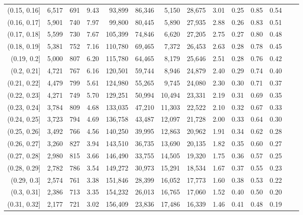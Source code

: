 \begin{tabular}{rrrrrrrrrrrrrr}
(0.15, 0.16]   &  6,517 &  691 &    9.43 &   93,899 &   86,346 &   5,150 &  28,675 &  3.01 &  0.25 &  0.85 &      0.54 \\
(0.16, 0.17]   &  5,901 &  740 &    7.97 &   99,800 &   80,445 &   5,890 &  27,935 &  2.88 &  0.26 &  0.83 &      0.51 \\
(0.17, 0.18]   &  5,599 &  730 &    7.67 &  105,399 &   74,846 &   6,620 &  27,205 &  2.75 &  0.27 &  0.80 &      0.48 \\
(0.18, 0.19]   &  5,381 &  752 &    7.16 &  110,780 &   69,465 &   7,372 &  26,453 &  2.63 &  0.28 &  0.78 &      0.45 \\
(0.19, 0.2]    &  5,000 &  807 &    6.20 &  115,780 &   64,465 &   8,179 &  25,646 &  2.51 &  0.28 &  0.76 &      0.42 \\
(0.2, 0.21]    &  4,721 &  767 &    6.16 &  120,501 &   59,744 &   8,946 &  24,879 &  2.40 &  0.29 &  0.74 &      0.40 \\
(0.21, 0.22]   &  4,479 &  799 &    5.61 &  124,980 &   55,265 &   9,745 &  24,080 &  2.30 &  0.30 &  0.71 &      0.37 \\
(0.22, 0.23]   &  4,271 &  749 &    5.70 &  129,251 &   50,994 &  10,494 &  23,331 &  2.19 &  0.31 &  0.69 &      0.35 \\
(0.23, 0.24]   &  3,784 &  809 &    4.68 &  133,035 &   47,210 &  11,303 &  22,522 &  2.10 &  0.32 &  0.67 &      0.33 \\
(0.24, 0.25]   &  3,723 &  794 &    4.69 &  136,758 &   43,487 &  12,097 &  21,728 &  2.00 &  0.33 &  0.64 &      0.30 \\
(0.25, 0.26]   &  3,492 &  766 &    4.56 &  140,250 &   39,995 &  12,863 &  20,962 &  1.91 &  0.34 &  0.62 &      0.28 \\
(0.26, 0.27]   &  3,260 &  827 &    3.94 &  143,510 &   36,735 &  13,690 &  20,135 &  1.82 &  0.35 &  0.60 &      0.27 \\
(0.27, 0.28]   &  2,980 &  815 &    3.66 &  146,490 &   33,755 &  14,505 &  19,320 &  1.75 &  0.36 &  0.57 &      0.25 \\
(0.28, 0.29]   &  2,782 &  786 &    3.54 &  149,272 &   30,973 &  15,291 &  18,534 &  1.67 &  0.37 &  0.55 &      0.23 \\
(0.29, 0.3]    &  2,574 &  761 &    3.38 &  151,846 &   28,399 &  16,052 &  17,773 &  1.60 &  0.38 &  0.53 &      0.22 \\
(0.3, 0.31]    &  2,386 &  713 &    3.35 &  154,232 &   26,013 &  16,765 &  17,060 &  1.52 &  0.40 &  0.50 &      0.20 \\
(0.31, 0.32]   &  2,177 &  721 &    3.02 &  156,409 &   23,836 &  17,486 &  16,339 &  1.46 &  0.41 &  0.48 &      0.19 \\

\end{tabular}
